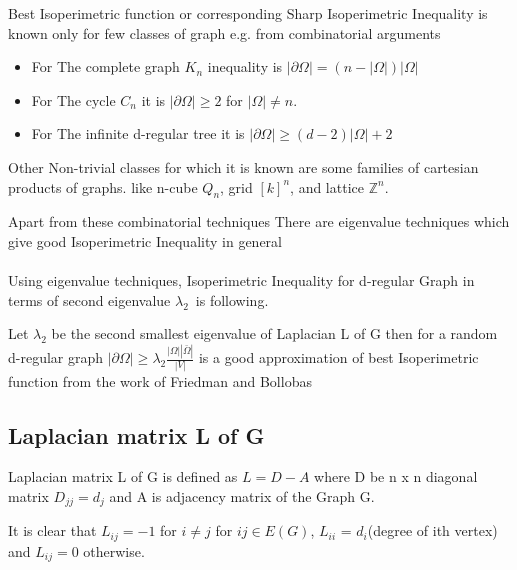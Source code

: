 \documentclass[oneside]{book}
\begin{document}
 Best Isoperimetric function or corresponding Sharp Isoperimetric Inequality is known only for few classes of graph e.g.
from combinatorial arguments 
\par
\begin{itemize}
    \item For The complete graph $K_{n}$ inequality is $|\partial \Omega|=(n-|\Omega|) | \Omega|$ 
    \item For The cycle $C_{n}$ it is  $|\partial \Omega|\geq 2$ for $|\Omega| \neq n$.
    \item For The infinite d-regular tree it is $|\partial \Omega| \geq(d-2)| \Omega|+2$\par
\end{itemize}
 
  
     
     Other Non-trivial classes for which it is known are some families of cartesian products of graphs. like 
n-cube $Q_{n}$, 
grid $[k]^{n}$,
and lattice $\mathbb{Z}^{n}$.
\par
 Apart from these combinatorial techniques There are eigenvalue techniques which give good Isoperimetric Inequality in general \\\\
 
 Using eigenvalue techniques, 
 Isoperimetric Inequality for d-regular Graph in terms of second eigenvalue $\lambda_2$\ is following. \par
  
 Let $\lambda_{2}$ be the second smallest eigenvalue of Laplacian L of G then for a random d-regular graph $|\partial \Omega| \geq \lambda_{2} \frac{|\Omega||\bar{\Omega}|}{|V|}$  is a good approximation of best Isoperimetric function from the work of Friedman and Bollobas  \par 
     
     
     \subsection{Laplacian matrix L of G }
     
      Laplacian matrix L of G is defined as  $L = D - A$ where  D be n x n diagonal matrix $D_{jj} = d_{j}$ and A is adjacency matrix of the Graph G.\par
      
          
            
          It is clear that   $L_{ij} = -1$ for $i\neq j$  for $ij\in E(G)$,  $L_{ii}$ = $d_i$(degree of ith vertex) and   $L_{ij} = 0$ otherwise.\par
          
\end{document}

